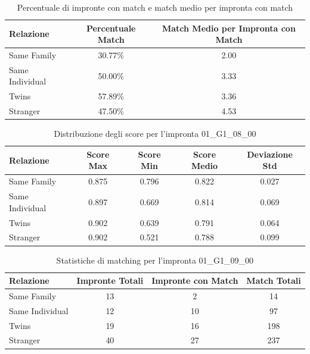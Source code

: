\begin{table}[htbp]
\centering
\caption{Percentuale di impronte con match e match medio per impronta con match}
\label{tab:match_percentage_01_G1_08_00}
\begin{tabular}{|l|c|c|}
\hline
\textbf{Relazione} & \textbf{Percentuale Match} & \textbf{Match Medio per Impronta con Match} \\
\hline
Same Family & 30.77\% & 2.00 \\
\hline
Same Individual & 50.00\% & 3.33 \\
\hline
Twins & 57.89\% & 3.36 \\
\hline
Stranger & 47.50\% & 4.53 \\
\hline
\end{tabular}
\end{table}


\begin{table}[htbp]
\centering
\caption{Distribuzione degli score per l'impronta 01\_G1\_08\_00}
\label{tab:scores_01_G1_08_00}
\begin{tabular}{|l|c|c|c|c|}
\hline
\textbf{Relazione} & \textbf{Score Max} & \textbf{Score Min} & \textbf{Score Medio} & \textbf{Deviazione Std} \\
\hline
Same Family & 0.875 & 0.796 & 0.822 & 0.027 \\
\hline
Same Individual & 0.897 & 0.669 & 0.814 & 0.069 \\
\hline
Twins & 0.902 & 0.639 & 0.791 & 0.064 \\
\hline
Stranger & 0.902 & 0.521 & 0.788 & 0.099 \\
\hline
\end{tabular}
\end{table}


\begin{table}[htbp]
\centering
\caption{Statistiche di matching per l'impronta 01\_G1\_09\_00}
\label{tab:results_01_G1_09_00}
\begin{tabular}{|l|c|c|c|}
\hline
\textbf{Relazione} & \textbf{Impronte Totali} & \textbf{Impronte con Match} & \textbf{Match Totali} \\
\hline
Same Family & 13 & 2 & 14 \\
\hline
Same Individual & 12 & 10 & 97 \\
\hline
Twins & 19 & 16 & 198 \\
\hline
Stranger & 40 & 27 & 237 \\
\hline
\end{tabular}
\end{table}


